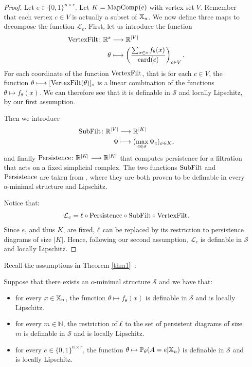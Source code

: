 \begin{proof}  Let $e\in{\{0,1\}}^{n\times r}$. Let $K=\text{MapComp}(e)$ with vertex set $V$.
Remember that each vertex $c \in V$ is actually a subset of $\mathbb{X}_n$. We now define three maps to decompose the function $\mathcal{L}_e$. First, let us introduce the function     
\begin{align*}
\text{VertexFilt} \colon \mathbb{R}^s  &\longrightarrow \mathbb{R}^{\mid V\mid}\\
\theta&\longmapsto \left(\frac{\sum_{x\in c} f_\theta(x) }{\text{card}(c)}\right)_{c\in V}.
\end{align*}
For each coordinate of the function $\text{VertexFilt}$, that is for each $c \in V$, the function $\theta \longmapsto [\text{VertexFilt} (\theta)]_c$  
is a linear combination of the functions $\theta\mapsto f_\theta(x)$. We can therefore see that it is definable in $\mathcal{S}$ and locally Lipschitz, by our first assumption. 

Then we introduce 
\begin{align*}
\text{SubFilt}\colon \mathbb{R}^{\mid V\mid}  &\longrightarrow \mathbb{R}^{\mid K\mid}\\
\Phi&\longmapsto (\max_{c\in\sigma}\Phi_c)_{\sigma\in K},
\end{align*}
and finally $\text{Persistence} \colon \mathbb{R}^{\mid K\mid}   \longrightarrow \mathbb{R}^{\mid K\mid} $ that computes persistence for a filtration that acts on a fixed simplicial complex. The two functions $\text{SubFilt}$ and $\text{Persistence}$  are taken from \cite{carriere2021optimizing}, where they are both proven to be definable in every o-minimal structure and Lipschitz.

Notice that:
$$\mathcal{L}_{e}=\ell \circ\text{Persistence}\circ\text{SubFilt}\circ\text{VertexFilt}.$$
Since $e$, and thus $K$, are fixed, $\ell$ can be replaced by its restriction to persistence diagrams of size $\vert K\vert$.
Hence, following our second assumption, $\mathcal{L}_{e}$ is definable in $\mathcal{S}$ and locally Lipschitz.
\end{proof}

Recall the assumptions in Theorem \ref{thm1}~:

    Suppose that there exists an o-minimal structure $\mathcal{S}$ and we have that: 
    \begin{itemize}
        \item for every $x\in\mathbb{X}_n$, the function $\theta\mapsto f_\theta(x)$ is definable in $\mathcal{S}$ and is locally Lipschitz.
        \item for every $m\in\mathbb{N}$, the restriction of $\ell$ to the set of persistent diagrams of size $m$ 
is definable in $\mathcal{S}$ and is locally Lipschitz. 
        \item for every $e\in{\{0,1\}}^{n\times r}$, the function $\theta\mapsto \mathbb{P}_\theta(A =e| \mathbb{X}_n)$ is definable in $\mathcal{S}$ and is locally Lipschitz.

    \end{itemize}



